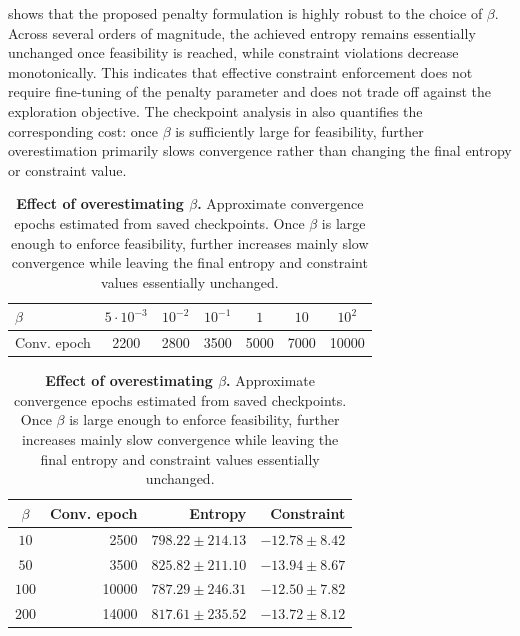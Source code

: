 \documentclass{article}
\theoremstyle{plain}
\theoremstyle{definition}
\theoremstyle{remark}
\begin{document}
 shows that the proposed penalty formulation is highly robust
to the choice of
$\beta$. Across several orders of magnitude, the achieved entropy remains essentially unchanged once
feasibility is reached, while constraint violations decrease monotonically.
This indicates that effective constraint enforcement does not require fine-tuning of
the penalty parameter and does not trade off against the exploration objective.
The checkpoint analysis in
 also
quantifies the corresponding cost: once $\beta$ is sufficiently large for
feasibility, further overestimation primarily slows convergence rather than
changing the final entropy or constraint value.

\begin{table}[!ht]
 \centering
 \begin{minipage}[t]{0.46\linewidth}
  \centering
  \scriptsize
  \setlength{\tabcolsep}{1.7pt}
  \renewcommand{\arraystretch}{0.95}
  \begin{tabular}{@{}lcccccc@{}}
   \toprule
   $\beta$         &
   $5\cdot10^{-3}$ & $10^{-2}$ & $10^{-1}$ & $1$  & $10$ & $10^2$         \\
   \midrule
   Conv. epoch     & 2200      & 2800      & 3500 & 5000 & 7000   & 10000 \\
   \bottomrule
  \end{tabular}
  \captionsetup{justification=justified,singlelinecheck=false}
  \label{sub-tab:BetaSensitivityConvergence-GridWorld}
 \end{minipage}
 \hfill
 \begin{minipage}[t]{0.51\linewidth}
  \centering
  \scriptsize
  \setlength{\tabcolsep}{1.5pt}
  \renewcommand{\arraystretch}{0.95}
  \begin{tabular}{@{}crrr@{}}
   \toprule
   $\beta$ & Conv. epoch & Entropy           & Constraint      \\
   \midrule
   $10$    & 2500        & $798.22\pm214.13$ & $-12.78\pm8.42$ \\
   $50$    & 3500        & $825.82\pm211.10$ & $-13.94\pm8.67$ \\
   $100$   & 10000       & $787.29\pm246.31$ & $-12.50\pm7.82$ \\
   $200$   & 14000       & $817.61\pm235.52$ & $-13.72\pm8.12$ \\
   \bottomrule
  \end{tabular}
  \captionsetup{justification=justified,singlelinecheck=false}
  \label{sub-tab:BetaSensitivityConvergence-Cartpole}
 \end{minipage}
 \caption{\textbf{Effect of overestimating $\beta$.}
  Approximate convergence epochs estimated from saved checkpoints.
  Once $\beta$ is large enough to enforce feasibility, further increases
  mainly slow convergence while leaving the final entropy and constraint
  values essentially unchanged.}
 \label{tab:BetaSensitivityConvergence}
\end{table}
\end{document}
